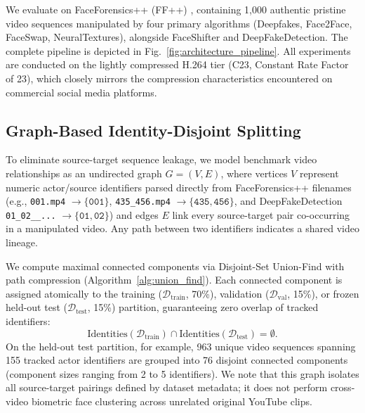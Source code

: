 \documentclass[conference]{IEEEtran}
\begin{document}
We evaluate on FaceForensics++ (FF++) \cite{rossler2019faceforensics}, containing 1,000 authentic pristine video sequences manipulated by four primary algorithms (Deepfakes, Face2Face, FaceSwap, NeuralTextures), alongside FaceShifter and DeepFakeDetection. The complete pipeline is depicted in Fig.~\ref{fig:architecture_pipeline}. All experiments are conducted on the lightly compressed H.264 tier (C23, Constant Rate Factor of 23), which closely mirrors the compression characteristics encountered on commercial social media platforms.

\subsection{Graph-Based Identity-Disjoint Splitting}

To eliminate source-target sequence leakage, we model benchmark video relationships as an undirected graph $G = (V, E)$, where vertices $V$ represent numeric actor/source identifiers parsed directly from FaceForensics++ filenames (e.g., \texttt{001.mp4} $\to \{\texttt{001}\}$, \texttt{435\_456.mp4} $\to \{\texttt{435}, \texttt{456}\}$, and DeepFakeDetection \texttt{01\_02\_\_...} $\to \{\texttt{01}, \texttt{02}\}$) and edges $E$ link every source-target pair co-occurring in a manipulated video. Any path between two identifiers indicates a shared video lineage.

We compute maximal connected components via Disjoint-Set Union-Find with path compression \cite{cozzolino2021idreveal} (Algorithm~\ref{alg:union_find}). Each connected component is assigned atomically to the training ($\mathcal{D}_{\text{train}}$, 70\%), validation ($\mathcal{D}_{\text{val}}$, 15\%), or frozen held-out test ($\mathcal{D}_{\text{test}}$, 15\%) partition, guaranteeing zero overlap of tracked identifiers:
\begin{equation}
\text{Identities}(\mathcal{D}_{\text{train}}) \cap \text{Identities}(\mathcal{D}_{\text{test}}) = \emptyset.
\end{equation}
On the held-out test partition, for example, 963 unique video sequences spanning 155 tracked actor identifiers are grouped into 76 disjoint connected components (component sizes ranging from 2 to 5 identifiers). We note that this graph isolates all source-target pairings defined by dataset metadata; it does not perform cross-video biometric face clustering across unrelated original YouTube clips.
\end{document}
